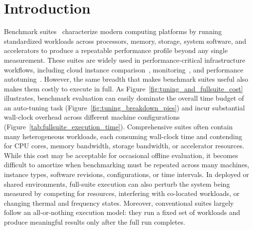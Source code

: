 \documentclass[sigplan,10pt]{acmart}
\begin{document}
\section{Introduction}
Benchmark suites~\cite{PTS,smith2011byte,kopytov2004sysbench} characterize modern computing platforms by running standardized workloads across processors, memory, storage, system software, and accelerators to produce a repeatable performance profile beyond any single measurement. These suites are widely used in performance-critical infrastructure workflows, including cloud instance comparison~\cite{aslanpour2020performance,lenk2011you,hwang2015cloud,marieska2011performance,moschetta2012ofbench,alhamazani2015cross}, monitoring~\cite{baruwal2016smart}, and performance autotuning~\cite{wang2023keentune,openeuler_atune_readme_zh,chen2024autoos,sun2025kconfigtune}. However, the same breadth that makes benchmark suites useful also makes them costly to execute in full. 
As Figure~\ref{fig:tuning_and_fullsuite_cost} illustrates, benchmark evaluation can easily dominate the overall time budget of an auto-tuning task (Figure~\ref{fig:tuning_breakdown_pies}) and incur substantial wall-clock overhead across different machine configurations (Figure~\ref{tab:fullsuite_execution_time}). 
Comprehensive suites often contain many heterogeneous workloads, each consuming wall-clock time and contending for CPU cores, memory bandwidth, storage bandwidth, or accelerator resources. While this cost may be acceptable for occasional offline evaluation, it becomes difficult to amortize when benchmarking must be repeated across many machines, instance types, software revisions, configurations, or time intervals. In deployed or shared environments, full-suite execution can also perturb the system being measured by competing for resources, interfering with co-located workloads, or changing thermal and frequency states. Moreover, conventional suites largely follow an all-or-nothing execution model: they run a fixed set of workloads and produce meaningful results only after the full run completes.
\end{document}

